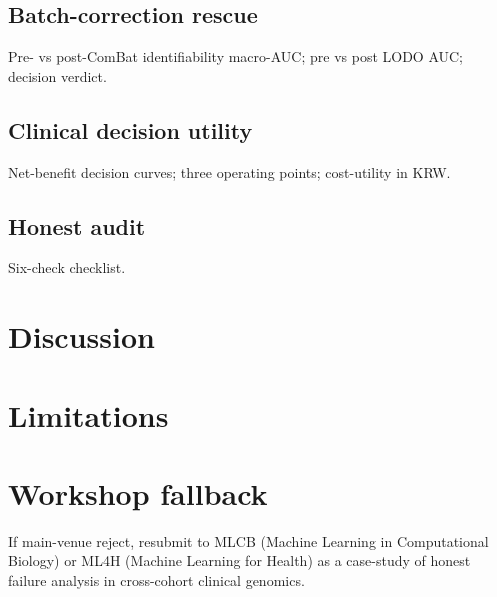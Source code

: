 \documentclass[11pt]{article}
\begin{document}
\subsection{Batch-correction rescue}
Pre- vs post-ComBat identifiability macro-AUC;
pre vs post LODO AUC; decision verdict.
\subsection{Clinical decision utility}
Net-benefit decision curves; three operating points; cost-utility in KRW.
\subsection{Honest audit}
Six-check checklist.

\section{Discussion}
\section{Limitations}
\section{Workshop fallback}
If main-venue reject, resubmit to MLCB (Machine Learning in Computational
Biology) or ML4H (Machine Learning for Health) as a case-study of honest
failure analysis in cross-cohort clinical genomics.



\end{document}
